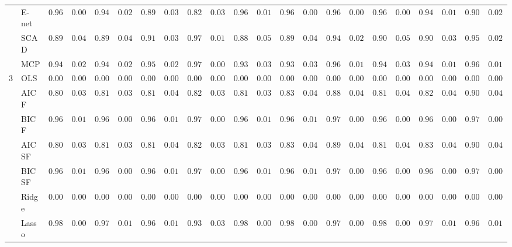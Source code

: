 \begin{tabular}{ll|ll|llllll|llllll|llllll}
 & E-net  & $0.9654$ & $0.0072$ & $0.9437$ & $0.0264$ & $0.8922$ & $0.0311$ & $0.8260$ & $0.0327$ & $0.9654$ & $0.0144$ & $0.9674$ & $0.0038$ & $0.9639$ & $0.0056$ & $0.9646$ & $0.0077$ & $0.9441$ & $0.0177$ & $0.9066$ & $0.0221$ \\
 & SCAD  & $0.8940$ & $0.0469$ & $0.8994$ & $0.0487$ & $0.9156$ & $0.0358$ & $0.9714$ & $0.0105$ & $0.8898$ & $0.0535$ & $0.8942$ & $0.0498$ & $0.9498$ & $0.0255$ & $0.9012$ & $0.0526$ & $0.9054$ & $0.0369$ & $0.9574$ & $0.0219$ \\
 & MCP  & $0.9412$ & $0.0276$ & $0.9423$ & $0.0295$ & $0.9514$ & $0.0209$ & $0.9727$ & $0.0085$ & $0.9399$ & $0.0312$ & $0.9364$ & $0.0325$ & $0.9649$ & $0.0158$ & $0.9436$ & $0.0345$ & $0.9436$ & $0.0195$ & $0.9626$ & $0.0174$ \\\hline
3 & OLS  & $0.0000$ & $0.0000$ & $0.0000$ & $0.0000$ & $0.0000$ & $0.0000$ & $0.0000$ & $0.0000$ & $0.0000$ & $0.0000$ & $0.0000$ & $0.0000$ & $0.0000$ & $0.0000$ & $0.0000$ & $0.0000$ & $0.0000$ & $0.0000$ & $0.0000$ & $0.0000$ \\
 & AIC F  & $0.8044$ & $0.0392$ & $0.8121$ & $0.0388$ & $0.8123$ & $0.0415$ & $0.8241$ & $0.0338$ & $0.8115$ & $0.0379$ & $0.8305$ & $0.0417$ & $0.8878$ & $0.0427$ & $0.8112$ & $0.0434$ & $0.8280$ & $0.0443$ & $0.9041$ & $0.0459$ \\
 & BIC F  & $0.9619$ & $0.0117$ & $0.9623$ & $0.0085$ & $0.9624$ & $0.0113$ & $0.9760$ & $0.0075$ & $0.9614$ & $0.0106$ & $0.9657$ & $0.0118$ & $0.9769$ & $0.0066$ & $0.9636$ & $0.0092$ & $0.9665$ & $0.0094$ & $0.9793$ & $0.0072$ \\
 & AIC SF  & $0.8051$ & $0.0388$ & $0.8135$ & $0.0387$ & $0.8128$ & $0.0419$ & $0.8242$ & $0.0338$ & $0.8119$ & $0.0377$ & $0.8327$ & $0.0404$ & $0.8911$ & $0.0416$ & $0.8123$ & $0.0427$ & $0.8304$ & $0.0429$ & $0.9047$ & $0.0448$ \\
 & BIC SF  & $0.9619$ & $0.0117$ & $0.9623$ & $0.0085$ & $0.9625$ & $0.0112$ & $0.9760$ & $0.0075$ & $0.9614$ & $0.0106$ & $0.9657$ & $0.0118$ & $0.9769$ & $0.0066$ & $0.9636$ & $0.0092$ & $0.9665$ & $0.0094$ & $0.9793$ & $0.0072$ \\
 & Ridge  & $0.0000$ & $0.0000$ & $0.0000$ & $0.0000$ & $0.0000$ & $0.0000$ & $0.0000$ & $0.0000$ & $0.0000$ & $0.0000$ & $0.0000$ & $0.0000$ & $0.0000$ & $0.0000$ & $0.0000$ & $0.0000$ & $0.0000$ & $0.0000$ & $0.0000$ & $0.0000$ \\
 & Lasso  & $0.9865$ & $0.0062$ & $0.9793$ & $0.0118$ & $0.9667$ & $0.0184$ & $0.9361$ & $0.0307$ & $0.9862$ & $0.0059$ & $0.9833$ & $0.0089$ & $0.9755$ & $0.0094$ & $0.9806$ & $0.0080$ & $0.9733$ & $0.0104$ & $0.9634$ & $0.0148$ \\

\end{tabular}
